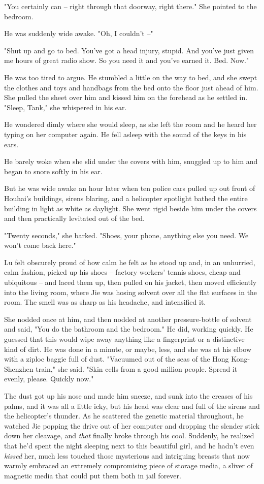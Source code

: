 "You certainly can -- right through that doorway, right there." She
pointed to the bedroom.

He was suddenly wide awake. "Oh, I couldn't --"

"Shut up and go to bed. You've got a head injury, stupid. And
you've just given me hours of great radio show. So you need it and
you've earned it. Bed. Now."

He was too tired to argue. He stumbled a little on the way to bed,
and she swept the clothes and toys and handbags from the bed onto
the floor just ahead of him. She pulled the sheet over him and
kissed him on the forehead as he settled in. "Sleep, Tank," she
whispered in his ear.

He wondered dimly where she would sleep, as she left the room and
he heard her typing on her computer again. He fell asleep with the
sound of the keys in his ears.

He barely woke when she slid under the covers with him, snuggled up
to him and began to snore softly in his ear.

But he was wide awake an hour later when ten police cars pulled up
out front of Houhai's buildings, sirens blaring, and a helicopter
spotlight bathed the entire building in light as white as daylight.
She went rigid beside him under the covers and then practically
levitated out of the bed.

"Twenty seconds," she barked. "Shoes, your phone, anything else you
need. We won't come back here."

Lu felt obscurely proud of how calm he felt as he stood up and, in
an unhurried, calm fashion, picked up his shoes -- factory workers'
tennis shoes, cheap and ubiquitous -- and laced them up, then
pulled on his jacket, then moved efficiently into the living room,
where Jie was hosing solvent over all the flat surfaces in the
room. The smell was as sharp as his headache, and intensified it.

She nodded once at him, and then nodded at another pressure-bottle
of solvent and said, "You do the bathroom and the bedroom." He did,
working quickly. He guessed that this would wipe away anything like
a fingerprint or a distinctive kind of dirt. He was done in a
minute, or maybe, less, and she was at his elbow with a ziploc
baggie full of dust. "Vacuumed out of the seas of the Hong
Kong-Shenzhen train," she said. "Skin cells from a good million
people. Spread it evenly, please. Quickly now."

The dust got up his nose and made him sneeze, and sunk into the
creases of his palms, and it was all a little icky, but his head
was clear and full of the sirens and the helicopter's thunder. As
he scattered the genetic material throughout, he watched Jie
popping the drive out of her computer and dropping the slender
stick down her cleavage, and \emph{that} finally broke through his
cool. Suddenly, he realized that he'd spent the night sleeping next
to this beautiful girl, and he hadn't even \emph{kissed} her, much
less touched those mysterious and intriguing breasts that now
warmly embraced an extremely compromising piece of storage media, a
sliver of magnetic media that could put them both in jail forever.

